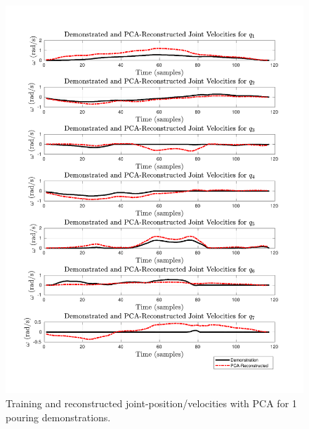 \documentclass{article}
\begin{document}
\begin{figure}[!th]
\begin{minipage}{0.5\textwidth}
       	\includegraphics[trim={1.2cm 1.6cm 1.7cm 1.6cm},clip,width=\linewidth]{../../src/JTDS_mat_lib/figures/pca_vel_pour1.pdf}
    \end{minipage}
   \caption{Training and reconstructed joint-position/velocities with PCA for 1 pouring demonstrations. \label{fig:pca_velocities}}
\end{figure}
\end{document}
